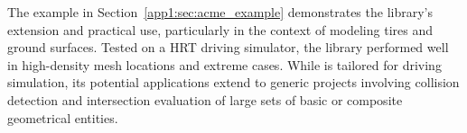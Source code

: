 The example in Section~\ref{app1:sec:acme_example} demonstrates the library's extension and practical use, particularly in the context of modeling tires and ground surfaces. Tested on a \ac{HRT} driving simulator, the library performed well in high-density mesh locations and extreme cases. While \Acme{} is tailored for driving simulation, its potential applications extend to generic projects involving collision detection and intersection evaluation of large sets of basic or composite geometrical entities.

